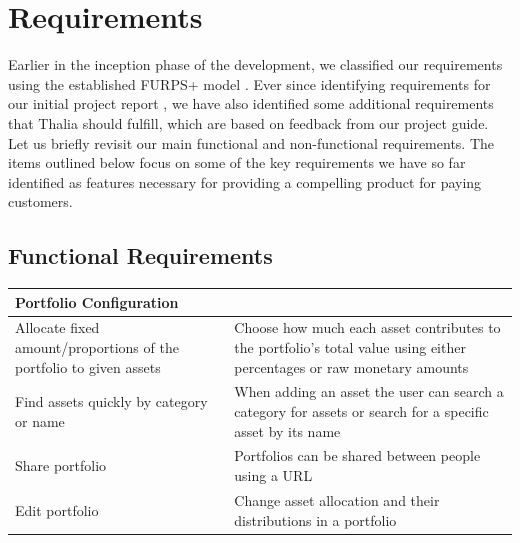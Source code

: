\documentclass[main.tex]{subfiles}
\begin{document}
\section{Requirements}
Earlier in the inception phase of the development, we classified our requirements using the established FURPS+ model \cite{FURPS}. Ever since identifying requirements for our initial project report \cite{TR}, we have also identified some additional requirements that Thalia should fulfill, which are based on feedback from our project guide. Let us briefly revisit our main functional and non-functional requirements. The items outlined below focus on some of the key requirements we have so far identified as features necessary for providing a compelling product for paying customers.

\subsection{Functional Requirements}
 
{
\setlength{\tabcolsep}{30pt}
\renewcommand{\arraystretch}{2}
\centering
{}
\begin{tabularx}{\linewidth}{|X|X|}
\hline
 \textbf{Portfolio Configuration}  &  \\
 \hline
 Allocate fixed amount/proportions of the portfolio to given assets & Choose how much each asset contributes to the portfolio's total value using either percentages or raw monetary amounts \\
\hline
Find assets quickly by category or name & When adding an asset the user can search a category for assets or search for a specific asset by its name \\
\hline
Share portfolio & Portfolios can be shared between people using a URL \\
\hline
Edit portfolio & Change asset allocation and their distributions in a portfolio \\
\hline
\end{tabularx}
}
\end{document}
